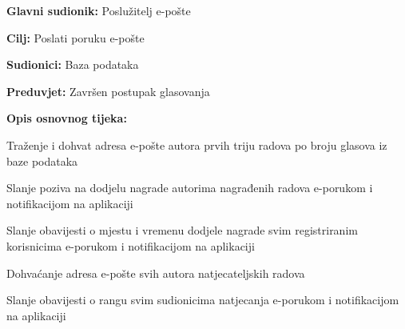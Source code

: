 					\noindent {}
					\begin{packed_item}
						
						\item \textbf{Glavni sudionik: } Poslužitelj e-pošte
						\item  \textbf{Cilj:} Poslati poruku e-pošte
						\item  \textbf{Sudionici:} Baza podataka
						\item  \textbf{Preduvjet:} Završen postupak glasovanja
						\item  \textbf{Opis osnovnog tijeka:}
						
						\item[] \begin{packed_enum}
							
							\item Traženje i dohvat adresa e-pošte autora prvih triju radova po broju glasova iz baze podataka
							\item Slanje poziva na dodjelu nagrade autorima nagrađenih radova e-porukom i notifikacijom na aplikaciji
							\item Slanje obavijesti o mjestu i vremenu dodjele nagrade svim registriranim korisnicima e-porukom i notifikacijom na aplikaciji
							\item Dohvaćanje adresa e-pošte svih autora natjecateljskih radova
							\item Slanje obavijesti o rangu svim sudionicima natjecanja e-porukom i notifikacijom na aplikaciji
						\end{packed_enum}
						
					\end{packed_item}
					
